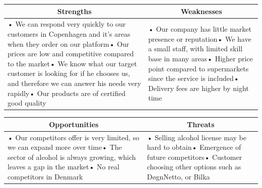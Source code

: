 \documentclass[12p]{article}
\begin{document}
\begin{table}[htbp]
  \centering
    \begin{tabular}{|p{}|p{}|}
    \hline
    \multicolumn{1}{|c|}{\textbf{Strengths}} & \multicolumn{1}{c|}{\textbf{Weaknesses}} \\
    \hline
    {• We can respond very quickly to our customers in Copenhagen and it's areas when they order on our platform\newline{}• Our prices are low and competitive compared to the market\newline{}• We know what our target customer is looking for if he chooses us, and therefore we can answer his needs very rapidly\newline{}• Our products are of certified good quality} & • Our company has little market presence or reputation\newline{}• We have a small staff, with limited skill base in many areas\newline{}• Higher price point compared to supermarkets since the service is included\newline{}• Delivery fees are higher by night time \\
    \hline
    \end{tabular}
  \label{tab:swot_one}
\end{table}

\begin{table}[htbp]
  \centering
    \begin{tabular}{|p{}|p{}|}
    \hline
    \multicolumn{1}{|c|}{\textbf{Opportunities}} & \multicolumn{1}{c|}{\textbf{Threats}} \\
    \hline
    {• Our competitors offer is very limited, so we can expand more over time\newline{}• The sector of alcohol is always growing, which leaves a gap in the market\newline{}• No real competitors in Denmark} & • Selling alcohol license may be hard to obtain\newline{}• Emergence of future competitors\newline{}• Customer choosing other options such as DøgnNetto, or Bilka \\
    \hline
    \end{tabular}
  \label{tab:swot_two}
\end{table}


\newpage

\end{document}
